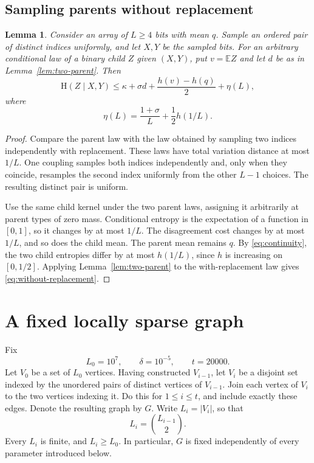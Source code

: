 \documentclass[11pt,leqno]{amsart}
\numberwithin{equation}{section}
\newtheorem{lemma}[theorem]{Lemma}
\theoremstyle{definition}
\theoremstyle{remark}
\newcommand{\E}{\mathbb E}
\newcommand{\HH}{\mathrm H}
\newcommand{\abs}[1]{\lvert#1\rvert}
\begin{document}
\subsection{Sampling parents without replacement}

\begin{lemma}\label{lem:without-replacement}
Consider an array of $L\ge4$ bits with mean $q$. Sample an ordered pair of distinct indices uniformly, and let $X,Y$ be the sampled bits. For an arbitrary conditional law of a binary child $Z$ given $(X,Y)$, put $v=\E Z$ and let $d$ be as in Lemma~\ref{lem:two-parent}. Then
\begin{equation}\label{eq:without-replacement}
 \HH(Z\mid X,Y)\le
 \kappa+\sigma d+\frac{h(v)-h(q)}2+\eta(L),
\end{equation}
where
\begin{equation}\label{eq:eta}
 \eta(L)=\frac{1+\sigma}{L}+\frac12h(1/L).
\end{equation}
\end{lemma}

\begin{proof}
Compare the parent law with the law obtained by sampling two indices independently with replacement. These laws have total variation distance at most $1/L$. One coupling samples both indices independently and, only when they coincide, resamples the second index uniformly from the other $L-1$ choices. The resulting distinct pair is uniform.

Use the same child kernel under the two parent laws, assigning it arbitrarily at parent types of zero mass. Conditional entropy is the expectation of a function in $[0,1]$, so it changes by at most $1/L$. The disagreement cost changes by at most $1/L$, and so does the child mean. The parent mean remains $q$. By \eqref{eq:continuity}, the two child entropies differ by at most $h(1/L)$, since $h$ is increasing on $[0,1/2]$. Applying Lemma~\ref{lem:two-parent} to the with-replacement law gives \eqref{eq:without-replacement}.
\end{proof}

\section{A fixed locally sparse graph}

Fix
\begin{equation}\label{eq:fixed-parameters}
 L_0=10^7,\qquad \delta=10^{-5},\qquad t=20000.
\end{equation}
Let $V_0$ be a set of $L_0$ vertices. Having constructed $V_{i-1}$, let $V_i$ be a disjoint set indexed by the unordered pairs of distinct vertices of $V_{i-1}$. Join each vertex of $V_i$ to the two vertices indexing it. Do this for $1\le i\le t$, and include exactly these edges. Denote the resulting graph by $G$. Write $L_i=\abs{V_i}$, so that
\[
 L_i=\binom{L_{i-1}}2.
\]
Every $L_i$ is finite, and $L_i\ge L_0$. In particular, $G$ is fixed independently of every parameter introduced below.
\end{document}
